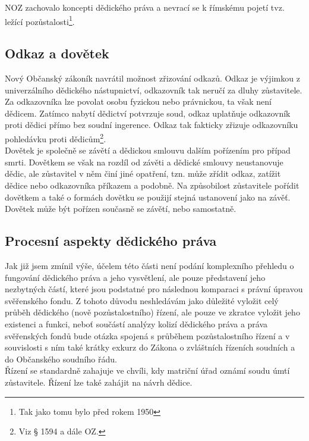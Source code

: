 \documentclass{article}
\begin{document}
NOZ zachovalo koncepti dědického práva a nevrací se k římskému pojetí tvz. ležící pozůstalosti\footnote{Tak jako tomu bylo před rokem 1950}.

\subsection{Odkaz a dovětek}

Nový Občanský zákoník navrátil možnost zřizování odkazů. Odkaz je výjimkou z univerzálního dědického nástupnictví, odkazovník tak neručí za dluhy zůstavitele. Za odkazovníka lze povolat osobu fyzickou nebo právnickou, ta však není dědicem. Zatímco nabytí dědictví potvrzuje soud, odkaz uplatňuje odkazovník proti dědici přímo bez soudní ingerence. Odkaz tak fakticky zřizuje odkazovníku pohledávku proti dědicům\footnote{Viz § 1594 a dále OZ.}.\\

Dovětek je společně se závětí a dědickou smlouvu dalším pořízením pro případ smrti. Dovětkem se však na rozdíl od závěti a dědické smlouvy neustanovuje dědic, ale zůstavitel v něm činí jiné opatření, tzn. může zřídit odkaz, zatížit dědice nebo odkazovníka příkazem a podobně. Na způsobilost zůstavitele pořídit dovětkem a také o formách dovětku se použijí stejná ustanovení jako na závěť. Dovětek může být pořízen současně se závětí, nebo samostatně.\\

\subsection{Procesní aspekty dědického práva}

Jak již jsem zmínil výše, účelem této části není podání komplexního přehledu o fungování dědického práva a jeho vysvětlení, ale pouze představení jeho nezbytných částí, které jsou podstatné pro následnou komparaci s právní úpravou svěřenského fondu. Z tohoto důvodu neshledávám jako důležité vyložit celý průběh dědického (nově pozůstalostního) řízení, ale pouze ve zkratce vyložit jeho existenci a funkci, neboť součástí analýzy kolizí dědického práva a práva svěřenských fondů bude otázka spojená s průběhem pozůstalostního řízení a v souvislosti s ním také krátky exkurz do Zákona o zvláštních řízeních soudních a do Občanského soudního řádu.\\

Řízení se standardně zahajuje ve chvíli, kdy matriční úřad oznámí soudu úmtí zůstavitele. Řízení lze také zahájit na návrh dědice.\\
\end{document}
